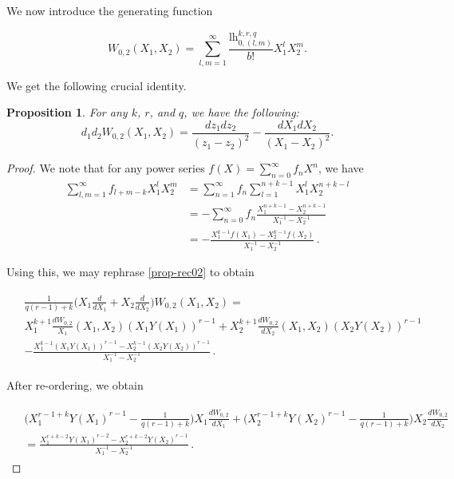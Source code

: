 \documentclass[10pt,a4paper,oneside,no-math,reqno]{amsart}%
\theoremstyle{plain}
\newtheorem{proposition}[theorem]{Proposition}
\theoremstyle{definition}
\theoremstyle{remark}
\numberwithin{equation}{section}
\newcommand{\1}{\mathds{1}}
\newcommand{\<}{\langle}
\renewcommand{\>}{\rangle}
\newcommand{\lh}{\mathord{\mathrm{l\!h}}}
\begin{document}
We now introduce the generating function

\begin{equation}
W_{0,2}(X_1,X_2)=\sum_{l,m=1}^\infty\frac{\lh_{0,(l,m)}^{k,r,q}}{b!}X_1^lX_2^m.
\end{equation}

We get the following crucial identity.

\begin{proposition}\label{Semistable}
For any $k$, $r$, and $q$, we have the following:
\begin{equation}
\label{equ-02}
d_1d_2W_{0,2}(X_1,X_2)=\frac{dz_1dz_2}{(z_1-z_2)^2}-\frac{dX_1dX_2}{(X_1-X_2)^2}.
\end{equation}
\end{proposition}

\begin{proof}
We note that for any power series $ f(X) = \sum_{n=0}^\infty f_n X^n$, we have
    \begin{equation}
    	\begin{split}
    		\sum_{l,m =1}^\infty f_{l+m-k} X_1^l X_2^m 
    		&=
    		\sum_{n=1}^\infty f_n \sum_{l = 1}^{n+k-1} X_1^l X_2^{n+k-l} 
    		\\
    		&= 
    		-\sum_{n=0}^\infty f_n \frac{X_1^{n+k-1} - X_2^{n+k-1}}{X_1^{-1}-X_2^{-1}}
    		\\
    		&= - \frac{X_1^{k-1} f(X_1) - X_2^{k-1} f(X_2)}{X_1^{-1} - X_2^{-1}}\,.
    	\end{split}
    \end{equation}

    Using this, we may rephrase \cref{prop-rec02} to obtain

    \begin{align}
    \begin{split}
         &\frac{1}{q(r-1)+k} \Big( X_1 \frac{d}{dX_1} + X_2 \frac{d}{dX_2} \Big) W_{0,2} (X_1,X_2)
      =\\
      &X_1^{k+1} \frac{dW_{0,2}}{X_1} (X_1,X_2) (X_1 Y(X_1))^{r-1} + X_2^{k+1} \frac{dW_{0,2}}{dX_2}(X_1,X_2) (X_2 Y(X_2))^{r-1}
      \\
      &  - 
      \frac{ X_1^{k-1} (X_1 Y(X_1))^{r-1} - X_2^{k-1} (X_2 Y(X_2))^{r-1}}{X_1^{-1} - X_2^{-1}} \,.
      \end{split}
    \end{align}

    After re-ordering, we obtain

    \begin{align}
    \begin{split}
        &\Big(X_1^{r-1+k} Y(X_1)^{r-1} - \frac{1}{q(r-1)+k}\Big) X_1 \frac{dW_{0,2}}{dX_1} + \Big( X_2^{r-1+k} Y(X_2)^{r-1} - \frac{1}{q(r-1)+k} \Big) X_2 \frac{dW_{0,2}}{dX_2} \\
        &= \frac{X_1^{r+k-2} Y(X_1)^{r-2} - X_2^{r+k-2} Y(X_2)^{r-1}}{X_1^{-1} - X_2^{-1}} \,.
    \end{split}
    \end{align}


\end{proof}
\end{document}
